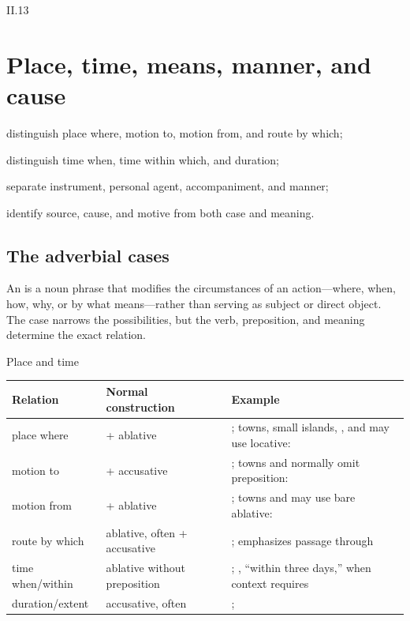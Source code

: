 \begin{courseunit}{II.13}
\chapter{Place, time, means, manner, and cause}

\begin{learningobjectives}
  \item distinguish place where, motion to, motion from, and route by which;
  \item distinguish time when, time within which, and duration;
  \item separate instrument, personal agent, accompaniment, and manner;
  \item identify source, cause, and motive from both case and meaning.
\end{learningobjectives}

\section{The adverbial cases}

An  is a noun phrase that modifies the circumstances
of an action---where, when, how, why, or by what means---rather than serving as
subject or direct object. The case narrows the possibilities, but the verb,
preposition, and meaning determine the exact relation.

\begin{grammarbox}{Place and time}
\begin{tabularx}{\linewidth}{@{}P{1.35in}P{1.5in}Y@{}}
\toprule
\textbf{Relation} & \textbf{Normal construction} & \textbf{Example}\\ \midrule
place where &  + ablative & ; towns, small islands,
, and  may use locative: \\
motion to &  + accusative & ; towns and
 normally omit preposition: \\
motion from &  + ablative & ; towns and
 may use bare ablative: \\
route by which & ablative, often  + accusative & ;
 emphasizes passage through\\
time when/within & ablative without preposition & ; ,
``within three days,'' when context requires\\
duration/extent & accusative, often  & ;
\\
\bottomrule
\end{tabularx}
\end{grammarbox}


\end{courseunit}
